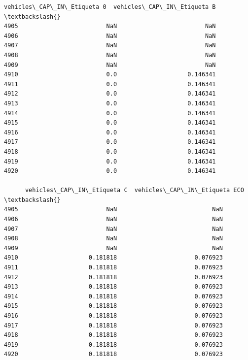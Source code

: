 \documentclass[11pt]{article}
\begin{document}
\begin{tcolorbox}[breakable, size=fbox, boxrule=.5pt, pad at break*=1mm, opacityfill=0]
\begin{Verbatim}[commandchars=\\\{\}]
      vehicles\_CAP\_IN\_Etiqueta 0  vehicles\_CAP\_IN\_Etiqueta B  \textbackslash{}
4905                         NaN                         NaN
4906                         NaN                         NaN
4907                         NaN                         NaN
4908                         NaN                         NaN
4909                         NaN                         NaN
4910                         0.0                    0.146341
4911                         0.0                    0.146341
4912                         0.0                    0.146341
4913                         0.0                    0.146341
4914                         0.0                    0.146341
4915                         0.0                    0.146341
4916                         0.0                    0.146341
4917                         0.0                    0.146341
4918                         0.0                    0.146341
4919                         0.0                    0.146341
4920                         0.0                    0.146341

      vehicles\_CAP\_IN\_Etiqueta C  vehicles\_CAP\_IN\_Etiqueta ECO  \textbackslash{}
4905                         NaN                           NaN
4906                         NaN                           NaN
4907                         NaN                           NaN
4908                         NaN                           NaN
4909                         NaN                           NaN
4910                    0.181818                      0.076923
4911                    0.181818                      0.076923
4912                    0.181818                      0.076923
4913                    0.181818                      0.076923
4914                    0.181818                      0.076923
4915                    0.181818                      0.076923
4916                    0.181818                      0.076923
4917                    0.181818                      0.076923
4918                    0.181818                      0.076923
4919                    0.181818                      0.076923
4920                    0.181818                      0.076923


\end{Verbatim}
\end{tcolorbox}
\end{document}
